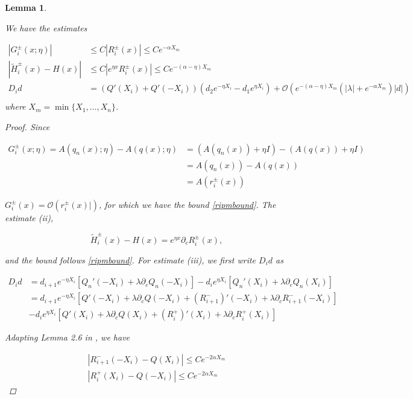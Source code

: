 \documentclass[12pt]{article}
\newtheorem{lemma}{Lemma}
\begin{document}
\begin{lemma}\label{estimates}

We have the estimates

\begin{align*}
|G_i^\pm(x; \eta)| &\leq C|R_i^\pm(x)| \leq C e^{-\alpha X_m} \\
| \tilde{H}_i^\pm(x)  - H(x) | & \leq C | e^{\eta x} R_i^\pm(x)| \leq C e^{-(\alpha - \eta) X_m}  \\
D_i d &= ( Q'(X_i) + Q'(-X_i) )(d_2 e^{-\eta X_i} - d_1 e^{\eta X_i}) + \mathcal{O} \left( e^{-(\alpha - \eta) X_m}\left( |\lambda| +  e^{-\alpha X_m} \right) |d| \right) \\
\end{align*}
where $X_m = \min\{X_1, \dots, X_n\}$.

\begin{proof}
Since 

\begin{align*}
G_i^\pm(x; \eta) = A(q_n(x); \eta) - A(q(x); \eta) &= (A(q_n(x)) + \eta I) - (A(q(x)) + \eta I) \\
&= A(q_n(x)) - A(q(x)) \\
&= A(r_i^\pm(x))
\end{align*}

$G_i^\pm(x) = \mathcal{O}(r_i^\pm(x)|)$, for which we have the bound \eqref{ripmbound}. The estimate (ii),

\[
\tilde{H}_i^\pm(x)  - H(x) = e^{\eta x} \partial_c R_i^\pm(x),
\]

and the bound follows \eqref{ripmbound}. For estimate (iii), we first write $D_i d$ as

\begin{align*}
D_i d &= d_{i+1} e^{-\eta X_i}[ Q_n'(-X_i) + \lambda \partial_c Q_n(-X_i)] 
- d_i e^{\eta X_i}[ Q_n'(X_i) + \lambda \partial_c Q_n(X_i)]  \\
&= d_{i+1} e^{-\eta X_i} [ Q'(-X_i) + \lambda \partial_c Q(-X_i) + (R_{i+1}^-)'(-X_i) + \lambda  \partial_c R_{i+1}^-(-X_i)] \\
&- d_i e^{\eta X_i} [ Q'(X_i) + \lambda \partial_c Q(X_i) + (R_i^+)'(X_i) + \lambda \partial_c R_i^+(X_i)] 
\end{align*}

Adapting Lemma 2.6 in \cite{Sandstede1998}, we have

\begin{align*}
|R_{i+1}^-(-X_i) - Q(X_i)| \leq C e^{-2 \alpha X_m} \\
|R_{i}^+(X_i) - Q(-X_i)| \leq C e^{-2 \alpha X_m}
\end{align*}


\end{proof}
\end{lemma}
\end{document}
